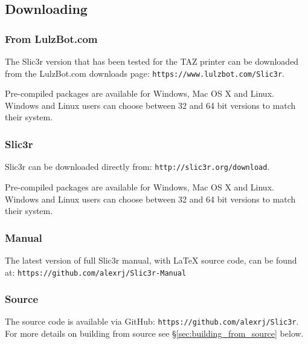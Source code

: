 

\subsection{Downloading}

\subsubsection{From LulzBot.com} %
\label{sub:from_LulzBot}
The Slic3r version that has been tested for the TAZ printer can be downloaded from the LulzBot.com downloads page: \texttt{https://www.lulzbot.com/Slic3r}.

Pre-compiled packages are available for Windows, Mac OS X and Linux.  Windows and Linux users can choose between 32 and 64 bit versions to match their system.

\subsubsection{Slic3r} %
\label{sub:slic3r}
Slic3r can be downloaded directly from: \texttt{http://slic3r.org/download}.

Pre-compiled packages are available for Windows, Mac OS X and Linux.  Windows and Linux users can choose between 32 and 64 bit versions to match their system.

\subsubsection{Manual} %
\label{sub:manual}

The latest version of full Slic3r manual, with {\LaTeX} source code, can be found at: \texttt{https://github.com/alexrj/Slic3r-Manual}


\subsubsection{Source} %
\label{sub:source}

The source code is available via GitHub: \texttt{https://github.com/alexrj/Slic3r}. For more details on building from source see §\ref{sec:building_from_source} below.

